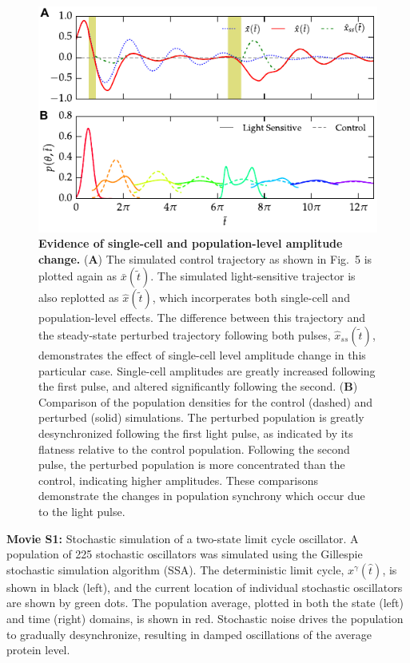 \documentclass[11pt, letterpaper]{article}
\begin{document}
\begin{figure}[h!]
  \begin{center}
    \includegraphics[width=.75\textwidth]{figures/figure_S4.pdf}
    \caption{
{\bfseries Evidence of single-cell and population-level amplitude change.}
({\bfseries A}) The simulated control trajectory as shown in Fig.~5 is plotted again as $\bar{x}(\tilde{t})$.
The simulated light-sensitive trajector is also replotted as $\hat{x}(\tilde{t})$, which incorperates both single-cell and population-level effects.
The difference between this trajectory and the steady-state perturbed trajectory following both pulses, $\hat{x}_{ss}(\tilde{t})$, demonstrates the effect of single-cell level amplitude change in this particular case. 
Single-cell amplitudes are greatly increased following the first pulse, and altered significantly following the second.
({\bfseries B})
Comparison of the population densities for the control (dashed) and perturbed (solid) simulations.
The perturbed population is greatly desynchronized following the first light pulse, as indicated by its flatness relative to the control population. 
Following the second pulse, the perturbed population is more concentrated than the control, indicating higher amplitudes. 
These comparisons demonstrate the changes in population synchrony which occur due to the light pulse. 
}
\end{center}
\end{figure}

\clearpage
{\bfseries Movie S1:} Stochastic simulation of a two-state limit cycle oscillator.
A population of 225 stochastic oscillators was simulated using the Gillespie stochastic simulation algorithm (SSA).
The deterministic limit cycle, $x^\gamma(\hat{t})$, is shown in black (left), and the current location of individual stochastic oscillators are shown by green dots.
The population average, plotted in both the state (left) and time (right) domains, is shown in red.
Stochastic noise drives the population to gradually desynchronize, resulting in damped oscillations of the average protein level.
\\[2ex]
\end{document}
